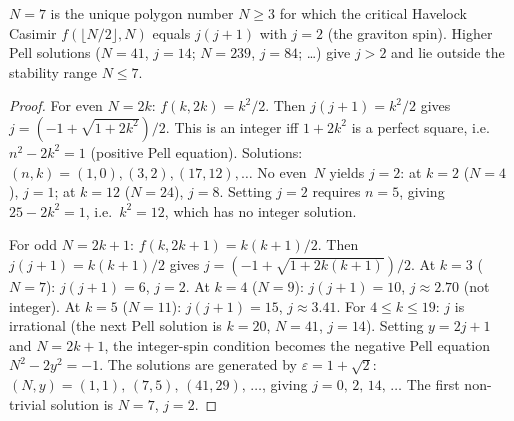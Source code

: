 \begin{proposition}
\label{prop:graviton}
$N = 7$ is the unique polygon number $N \ge 3$ for which the
critical Havelock Casimir $f(\lfloor N/2\rfloor, N)$
equals $j(j{+}1)$ with $j = 2$ (the graviton spin).
Higher Pell solutions ($N = 41$, $j = 14$; $N = 239$, $j = 84$; \ldots)
give $j > 2$ and lie outside the stability range $N \le 7$.
\end{proposition}

\begin{proof}
For even $N = 2k$: $f(k, 2k) = k^2/2$.
Then $j(j{+}1) = k^2/2$ gives
$j = (-1 + \sqrt{1 + 2k^2})/2$.
This is an integer iff $1 + 2k^2$ is a perfect square,
i.e.\ $n^2 - 2k^2 = 1$ (positive Pell equation).
Solutions: $(n,k) = (1,0), (3,2), (17,12), \ldots$
No even~$N$ yields $j = 2$: at $k = 2$ ($N = 4$), $j = 1$;
at $k = 12$ ($N = 24$), $j = 8$.
Setting $j = 2$ requires $n = 5$, giving $25 - 2k^2 = 1$,
i.e.\ $k^2 = 12$, which has no integer solution.

For odd $N = 2k{+}1$: $f(k, 2k{+}1) = k(k{+}1)/2$.
Then $j(j{+}1) = k(k{+}1)/2$ gives $j = (-1 + \sqrt{1+2k(k{+}1)})/2$.
At $k = 3$ ($N = 7$): $j(j{+}1) = 6$, $j = 2$.
At $k = 4$ ($N = 9$): $j(j{+}1) = 10$, $j \approx 2.70$ (not integer).
At $k = 5$ ($N = 11$): $j(j{+}1) = 15$, $j \approx 3.41$.
For $4 \le k \le 19$: $j$ is irrational (the next Pell
solution is $k = 20$, $N = 41$, $j = 14$).
Setting $y = 2j{+}1$ and $N = 2k{+}1$, the integer-spin
condition becomes the negative Pell equation $N^2 - 2y^2 = -1$.
The solutions are generated by $\varepsilon = 1 + \sqrt{2}$:
$(N,y) = (1,1),\, (7,5),\, (41,29),\, \ldots$,
giving $j = 0,\, 2,\, 14,\, \ldots$
The first non-trivial solution is $N = 7$, $j = 2$.
\end{proof}

